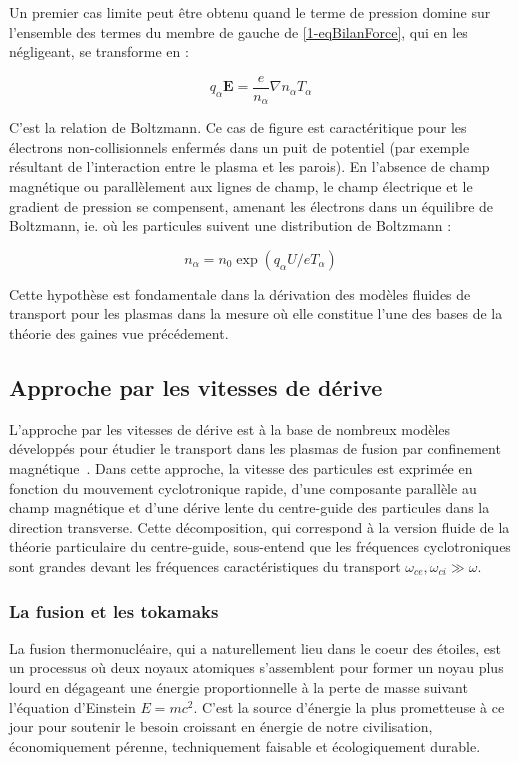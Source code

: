 \begin{refsection}
Un premier cas limite peut être obtenu quand le terme de pression domine
sur l'ensemble des termes du membre de gauche de \eqref{1-eqBilanForce}, qui en
les négligeant, se transforme en :

\begin{equation}
\label{1-equilibreBoltzman}
q_\alpha\mathbf
E =\frac{e}{n_\alpha}\nabla n_\alpha T_\alpha
\end{equation}

C'est la relation de Boltzmann. Ce cas de figure est caractéritique pour les
électrons non-collisionnels enfermés dans un puit de potentiel (par exemple résultant de
l'interaction entre le plasma et les parois). En l'absence de champ magnétique
ou parallèlement aux lignes de champ, le champ électrique et le gradient de
pression se compensent, amenant les électrons dans un équilibre de Boltzmann,
ie. où les particules suivent une distribution de Boltzmann :

\begin{equation}
\label{1-profilBoltzman}
n_\alpha=n_0\exp(q_\alpha U/eT_\alpha)
\end{equation}

Cette hypothèse est fondamentale dans la dérivation des modèles fluides de
transport pour les plasmas dans la mesure où elle constitue l'une des bases de
la théorie des gaines vue précédement. 

\subsection{Approche par les vitesses de dérive}

L'approche par les vitesses de dérive est à la base de nombreux modèles
développés pour étudier le transport dans les plasmas de fusion par
confinement magnétique~\parencite{Garcia,Bisai,Tamain}. Dans cette approche, la
vitesse des particules est exprimée en fonction du mouvement cyclotronique rapide, d'une composante
parallèle au champ magnétique et d'une dérive lente du centre-guide des particules dans
la direction transverse. Cette décomposition, qui correspond à la version fluide
de la théorie particulaire du centre-guide, sous-entend que les fréquences
cyclotroniques sont grandes devant les fréquences caractéristiques du transport
 $\omega_{ce},\omega_{ci}\gg\omega$.

\subsubsection{La fusion et les tokamaks}
La fusion thermonucléaire, qui a naturellement lieu dans le coeur des étoiles,
est un processus où deux noyaux atomiques s'assemblent pour former un noyau
plus lourd en dégageant une énergie proportionnelle à la perte de masse suivant
l'équation d'Einstein $E=mc^2$. C'est la source d'énergie la plus prometteuse
à ce jour pour soutenir le besoin croissant en énergie de notre civilisation,
économiquement pérenne, techniquement faisable et écologiquement durable.


\end{refsection}
